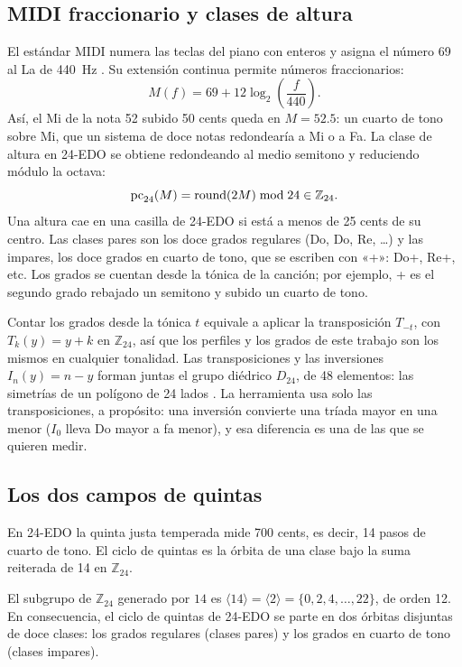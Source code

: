 \subsection{MIDI fraccionario y clases de altura}

El estándar MIDI numera las teclas del piano con enteros y asigna el número 69 al La de 440~Hz \citep{midi1996}. Su
extensión continua permite números fraccionarios:
\[
  M(f) = 69 + 12 \log_2\!\left(\frac{f}{440}\right).
\]
Así, el Mi de la nota 52 subido 50 cents queda en $M = 52.5$: un cuarto de tono sobre Mi, que un sistema de doce notas
redondearía a Mi o a Fa. La clase de altura en 24-EDO se obtiene redondeando al medio semitono y reduciendo módulo la
octava:
\[
  \operatorname{pc}_{24}(M) = \operatorname{round}(2M) \bmod 24 \in \mathbb{Z}_{24}.
\]
Una altura cae en una casilla de 24-EDO si está a menos de 25 cents de su centro. Las clases pares son los doce grados
regulares (Do, Do\sh, Re, \dots) y las impares, los doce grados en cuarto de tono, que se escriben con «+»: Do+, Re+,
etc. Los grados se cuentan desde la tónica de la canción; por ejemplo, + es el segundo grado rebajado un semitono y
subido un cuarto de tono.

Contar los grados desde la tónica $t$ equivale a aplicar la transposición $T_{-t}$, con $T_k(y) = y + k$ en
$\mathbb{Z}_{24}$, así que los perfiles y los grados de este trabajo son los mismos en cualquier tonalidad. Las
transposiciones y las inversiones $I_n(y) = n - y$ forman juntas el grupo diédrico $D_{24}$, de 48 elementos: las simetrías
de un polígono de 24 lados \citep{crans2009,flynn2025}. La herramienta usa solo las transposiciones, a propósito: una
inversión convierte una tríada mayor en una menor ($I_0$ lleva Do mayor a fa menor), y esa diferencia es una de las que
se quieren medir.

\subsection{Los dos campos de quintas}\label{sec:campos}

En 24-EDO la quinta justa temperada mide 700 cents, es decir, 14 pasos de cuarto de tono. El ciclo de quintas es la
órbita de una clase bajo la suma reiterada de 14 en $\mathbb{Z}_{24}$.

\begin{proposicion}\label{prop:campos}
El subgrupo de $\mathbb{Z}_{24}$ generado por $14$ es $\langle 14 \rangle = \langle 2 \rangle = \{0, 2, 4, \dots, 22\}$,
de orden 12. En consecuencia, el ciclo de quintas de 24-EDO se parte en dos órbitas disjuntas de doce clases: los grados
regulares (clases pares) y los grados en cuarto de tono (clases impares).
\end{proposicion}

